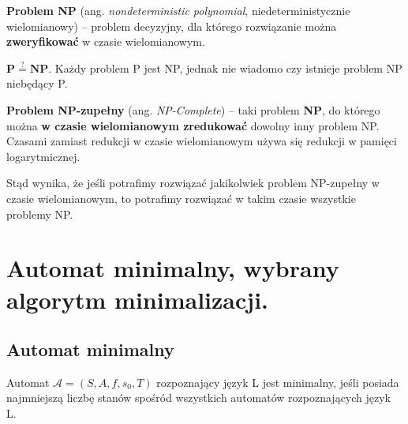 \documentclass[main.tex]{subfiles}
\begin{document}
    \begin{definition}
        \textbf{Problem NP} (ang. \textit{nondeterministic polynomial}, niedeterministycznie wielomianowy) – problem
        decyzyjny, dla którego rozwiązanie można \textbf{zweryfikować} w czasie wielomianowym.
    \end{definition}

    \begin{theorem}
        $\mathbf{P \stackrel{?}{=} NP}$. Każdy problem P jest NP, jednak nie wiadomo czy istnieje problem NP niebędący P.
    \end{theorem}

    \begin{definition}
        \textbf{Problem NP-zupełny} (ang. \textit{NP-Complete}) – taki problem \textbf{NP}, do którego można \textbf{w czasie wielomianowym zredukować} dowolny inny problem NP. Czasami zamiast redukcji w czasie wielomianowym używa się redukcji w pamięci logarytmicznej.
    \end{definition}
    Stąd wynika, że jeśli potrafimy rozwiązać jakikolwiek problem NP-zupełny w czasie wielomianowym,
    to potrafimy rozwiązać w takim czasie wszystkie problemy NP.

    \newpage

    \section{Automat minimalny, wybrany algorytm minimalizacji.}
    \subsection{Automat minimalny}
    \begin{definition}
        Automat $\mathcal{A} = (S, A, f, s_{0}, T)$ rozpoznający język L jest minimalny, jeśli posiada najmniejszą liczbę stanów spośród wszystkich automatów rozpoznających język L.
    \end{definition}
\end{document}
